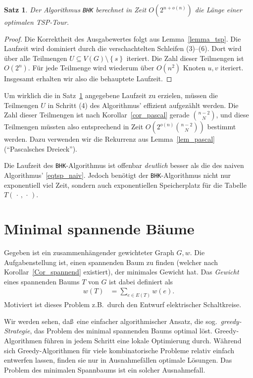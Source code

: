 \documentclass[10pt,reqno]{amsart}
\numberwithin{equation}{section}
\renewcommand\subset{\subseteq}
\newcommand\nix{\,\cdot\,}
\newtheorem{theorem}[definition]{Satz}
\newcommand\cbc[1]{\left\{{#1}\right\}}
\newcommand\Lem{Lemma}
\newcommand\Cor{Korollar}
\begin{document}
\begin{theorem}\label{thm_bhk}
	Der Algorithmus {\tt BHK} berechnet in Zeit $O(2^{n+o(n)})$ die L\"ange einer optimalen TSP-Tour.
\end{theorem}
\begin{proof}
	Die Korrektheit des Ausgabewertes folgt aus \Lem~\ref{lemma_tsp}.
	Die Laufzeit wird dominiert durch die verschachtelten Schleifen (3)--(6).
	Dort wird \"uber alle Teilmengen $U\subset V(G)\setminus\cbc s$ iteriert.
	Die Zahl dieser Teilmengen ist $O(2^n)$.
	F\"ur jede Teilmenge wird wiederum \"uber $O(n^2)$ Knoten $u,v$ iteriert.
	Insgesamt erhalten wir also die behauptete Laufzeit.
\end{proof}

Um wirklich die in Satz~\ref{thm_bhk} angegebene Laufzeit zu erzielen, m\"ussen die Teilmengen $U$ in Schritt (4) des Algorithmus' effizient aufgez\"ahlt werden.
Die Zahl dieser Teilmengen ist nach \Cor~\ref{cor_pascal} gerade $\binom{n-2}N$, und diese Teilmengen m\"ussten also entsprechend in Zeit $O(2^{o(n)}\binom{n-2}N)$ bestimmt werden.
Dazu verwenden wir die Rekurrenz aus \Lem~\ref{lem_pascal} (``Pascalsches Dreieck'').

Die Laufzeit des {\tt BHK}-Algorithmus ist offenbar {\em deutlich} besser als die des naiven Algorithmus' \eqref{eqtsp_naiv}.
Jedoch ben\"otigt der {\tt BHK}-Algorithmus nicht nur exponentiell viel Zeit, sondern auch exponentiellen Speicherplatz f\"ur die Tabelle $T(\nix,\nix)$.

\section{Minimal spannende B\"aume}\label{sec_mst}

\noindent
Gegeben ist ein zusammenh\"angender gewichteter Graph $G,w$.
Die Aufgabenstellung ist, einen spannenden Baum zu finden (welcher nach \Cor~\ref{Cor_spannend} existiert), der minimales Gewicht hat.
Das {\em Gewicht} eines spannenden Baums $T$ von $G$ ist dabei definiert als
\begin{align}\label{eqmst}
	w(T)&=\sum_{e\in E(T)}w(e).
\end{align}
Motiviert ist dieses Problem z.B.\ durch den Entwurf elektrischer Schaltkreise.

Wir werden sehen, da\ss\ eine einfacher algorithmischer Ansatz, die sog.\ {\em greedy-Strategie}, das Problem des minimal spannenden Baums optimal l\"ost.
Greedy-Algorithmen f\"uhren in jedem Schritt eine lokale Optimierung durch.
W\"ahrend sich Greedy-Algorithmen f\"ur viele kombinatorische Probleme relativ einfach entwerfen lassen, finden sie nur in Ausnahmef\"allen optimale L\"osungen.
Das Problem des minimalen Spannbaums ist ein solcher Ausnahmefall.
\end{document}
